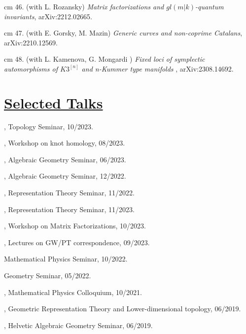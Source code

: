 \documentclass[11pt]{amsart}
\theoremstyle{plain}
\theoremstyle{definition}
\theoremstyle{remark}
\begin{document}
\noindent{} cm 46. (with L. Rozansky)
{\it  Matrix factorizations and \(gl(m|k)\)-quantum invariants}, arXiv:2212.02665.

\noindent{} cm 47. (with E. Gorsky, M. Mazin)
{\it  Generic curves and non-coprime Catalans}, arXiv:2210.12569.

\noindent{} cm 48. (with L. Kamenova, G. Mongardi )
{\it Fixed loci of symplectic automorphisms of \(K3^{[n]}\) and n-Kummer type manifolds
}, arXiv:2308.14692.











\section*{\Large\underline{ Selected Talks}}



\medskip

, Topology Seminar, 10/2023.

, Workshop on knot homology, 08/2023.

, Algebraic Geometry Seminar, 06/2023.

, Algebraic Geometry Seminar, 12/2022.

, Representation Theory Seminar, 11/2022.

, Representation  Theory Seminar, 11/2023.

, Workshop on Matrix Factorizations, 10/2023.

, Lectures on GW/PT correspondence, 09/2023.

 Mathematical Physics Seminar, 10/2022.

 Geometry Seminar, 05/2022.

, Mathematical Physics Colloquium, 10/2021.

, Geometric Representation Theory and Lower-dimensional topology, 06/2019.

,  Helvetic Algebraic Geometry Seminar, 06/2019.
\end{document}
